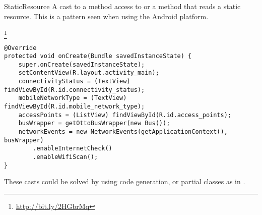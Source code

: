 \begin{pattern}{StaticResource}
A cast to a method access to  or a method that reads a static resource.
This is a pattern seen when using the Android platform. 

\instances{}

\footnote{\url{http://bit.ly/2HGbrMq}}

\begin{verbatim}
@Override
protected void onCreate(Bundle savedInstanceState) {
    super.onCreate(savedInstanceState);
    setContentView(R.layout.activity_main);
    connectivityStatus = (TextView) findViewById(R.id.connectivity_status);
    mobileNetworkType = (TextView) findViewById(R.id.mobile_network_type);
    accessPoints = (ListView) findViewById(R.id.access_points);
    busWrapper = getOttoBusWrapper(new Bus());
    networkEvents = new NetworkEvents(getApplicationContext(), busWrapper)
        .enableInternetCheck()
        .enableWifiScan();
}
\end{verbatim}

\detection{}

\discussion{}

These casts could be solved by using code generation,
or partial classes as in \csharp{}.

\end{pattern}
